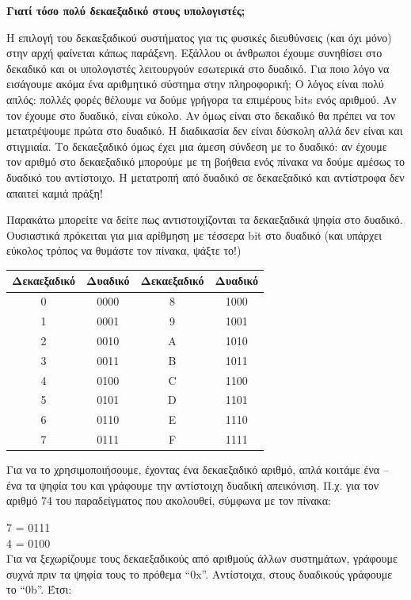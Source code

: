 \begin{inthebox}
\textbf{Γιατί τόσο πολύ δεκαεξαδικό στους υπολογιστές;}

Η επιλογή του δεκαεξαδικού συστήματος για τις φυσικές διευθύνσεις (και όχι μόνο) στην αρχή φαίνεται κάπως παράξενη. Εξάλλου οι άνθρωποι έχουμε συνηθίσει στο δεκαδικό και οι υπολογιστές λειτουργούν εσωτερικά στο δυαδικό. Για ποιο λόγο να εισάγουμε ακόμα ένα αριθμητικό σύστημα στην πληροφορική;
Ο λόγος είναι πολύ απλός: πολλές φορές θέλουμε να δούμε γρήγορα τα επιμέρους bits ενός αριθμού. Αν τον έχουμε στο δυαδικό, είναι εύκολο. Αν όμως είναι στο δεκαδικό θα πρέπει να τον μετατρέψουμε πρώτα στο δυαδικό. Η διαδικασία δεν είναι δύσκολη αλλά δεν είναι και στιγμιαία. Το δεκαεξαδικό όμως έχει μια άμεση σύνδεση με το δυαδικό: αν έχουμε τον αριθμό στο δεκαεξαδικό μπορούμε με τη βοήθεια ενός πίνακα να δούμε αμέσως το δυαδικό του αντίστοιχο. Η μετατροπή από δυαδικό σε δεκαεξαδικό και αντίστροφα δεν απαιτεί καμιά πράξη!

Παρακάτω μπορείτε να δείτε πως αντιστοιχίζονται τα δεκαεξαδικά ψηφία στο δυαδικό. Ουσιαστικά πρόκειται για μια αρίθμηση με τέσσερα bit στο δυαδικό (και υπάρχει εύκολος τρόπος να θυμάστε τον πίνακα, ψάξτε το!)

\begin{tabular}{|c|c||c|c|}
  \hline
    \textbf{Δεκαεξαδικό}&\textbf{Δυαδικό} & \textbf{Δεκαεξαδικό}&\textbf{Δυαδικό}\\
   \hline
 	0 & 0000 & 8 & 1000 \\
  \hline
   1 & 0001 & 9 & 1001 \\
  \hline
   2 & 0010 & A & 1010 \\
  \hline
   3 & 0011 & B & 1011 \\
  \hline
   4 & 0100 & C & 1100 \\
  \hline
   5 & 0101 & D & 1101 \\
  \hline
   6 & 0110 & E & 1110 \\
  \hline
   7 & 0111 & F & 1111 \\
  \hline
\end{tabular}

Για να το χρησιμοποιήσουμε, έχοντας ένα δεκαεξαδικό αριθμό, απλά κοιτάμε ένα -- ένα τα ψηφία του και γράφουμε την αντίστοιχη δυαδική απεικόνιση. Π.χ. για τον αριθμό 74 του παραδείγματος που ακολουθεί, σύμφωνα με τον πίνακα:

7 = 0111\\
4 = 0100\\

Για να ξεχωρίζουμε τους δεκαεξαδικούς από αριθμούς άλλων συστημάτων, γράφουμε συχνά πριν τα ψηφία τους το πρόθεμα ``0x''. Αντίστοιχα, στους δυαδικούς γράφουμε το ``0b''. Έτσι:


\end{inthebox}
